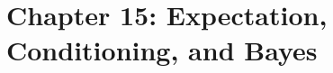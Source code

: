 \section{Chapter 15: Expectation, Conditioning, and Bayes}
\label{ch:expectation-conditioning-bayes}

